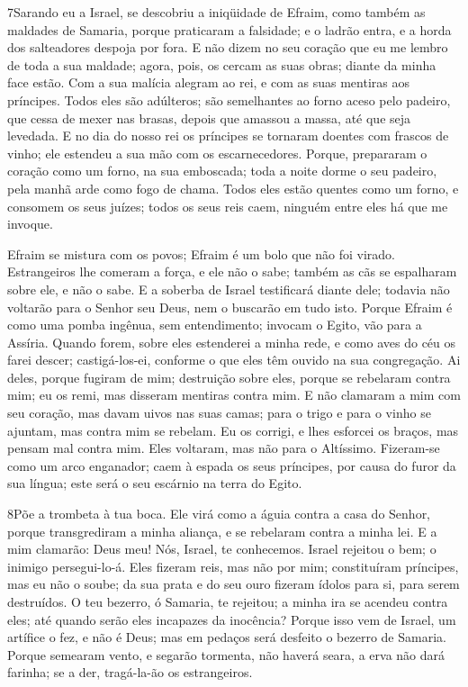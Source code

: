 \medskip

\lettrine{7} Sarando eu a Israel, se descobriu a iniqüidade de
Efraim, como também as maldades de Samaria, porque praticaram a
falsidade; e o ladrão entra, e a horda dos salteadores despoja por
fora. E não dizem no seu coração que eu me lembro de toda a sua
maldade; agora, pois, os cercam as suas obras; diante da minha face
estão. Com a sua malícia alegram ao rei, e com as suas mentiras
aos príncipes. Todos eles são adúlteros; são semelhantes ao
forno aceso pelo padeiro, que cessa de mexer nas brasas, depois que
amassou a massa, até que seja levedada. E no dia do nosso rei os
príncipes se tornaram doentes com frascos de vinho; ele estendeu a
sua mão com os escarnecedores. Porque, prepararam o coração como
um forno, na sua emboscada; toda a noite dorme o seu padeiro, pela
manhã arde como fogo de chama. Todos eles estão quentes como um
forno, e consomem os seus juízes; todos os seus reis caem, ninguém
entre eles há que me invoque.

Efraim se mistura com os povos; Efraim é um bolo que não foi
virado. Estrangeiros lhe comeram a força, e ele não o sabe;
também as cãs se espalharam sobre ele, e não o sabe. E a
soberba de Israel testificará diante dele; todavia não voltarão para
o Senhor seu Deus, nem o buscarão em tudo isto. Porque Efraim
é como uma pomba ingênua, sem entendimento; invocam o Egito, vão
para a Assíria. Quando forem, sobre eles estenderei a minha
rede, e como aves do céu os farei descer; castigá-los-ei, conforme o
que eles têm ouvido na sua congregação. Ai deles, porque
fugiram de mim; destruição sobre eles, porque se rebelaram contra
mim; eu os remi, mas disseram mentiras contra mim. E não
clamaram a mim com seu coração, mas davam uivos nas suas camas; para
o trigo e para o vinho se ajuntam, mas contra mim se rebelam.
Eu os corrigi, e lhes esforcei os braços, mas pensam mal
contra mim. Eles voltaram, mas não para o Altíssimo.
Fizeram-se como um arco enganador; caem à espada os seus príncipes,
por causa do furor da sua língua; este será o seu escárnio na terra
do Egito.

\medskip

\lettrine{8} Põe a trombeta à tua boca. Ele virá como a águia
contra a casa do Senhor, porque transgrediram a minha aliança, e se
rebelaram contra a minha lei. E a mim clamarão: Deus meu! Nós,
Israel, te conhecemos. Israel rejeitou o bem; o inimigo
persegui-lo-á. Eles fizeram reis, mas não por mim; constituíram
príncipes, mas eu não o soube; da sua prata e do seu ouro fizeram
ídolos para si, para serem destruídos. O teu bezerro, ó Samaria,
te rejeitou; a minha ira se acendeu contra eles; até quando serão
eles incapazes da inocência? Porque isso vem de Israel, um
artífice o fez, e não é Deus; mas em pedaços será desfeito o bezerro
de Samaria. Porque semearam vento, e segarão tormenta, não
haverá seara, a erva não dará farinha; se a der, tragá-la-ão os
estrangeiros.

